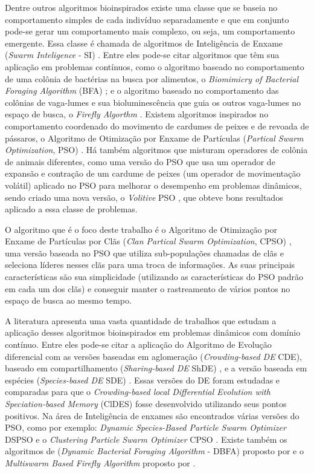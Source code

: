 Dentre outros algoritmos bioinspirados existe uma classe que se baseia no comportamento simples de cada indivíduo separadamente e que em conjunto pode-se gerar um comportamento mais complexo, ou seja, um comportamento emergente. Essa classe é chamada de algoritmos de Inteligência de Enxame (\textit{Swarm Inteligence} - SI) \cite{parpinelli2011new}. Entre eles pode-se citar algoritmos que têm sua aplicação em problemas contínuos, como o algoritmo baseado no comportamento de uma colônia de bactérias na busca por alimentos, o \textit{Biomimicry of Bacterial Foraging Algorithm} (BFA) \cite{passino2002biomimicry}; e o algoritmo baseado no comportamento das colônias de vaga-lumes e sua bioluminescência que guia os outros vaga-lumes no espaço de busca, o \textit{Firefly Algorthm} \cite{firefly}. Existem algoritmos inspirados no comportamento coordenado do movimento de cardumes de peixes e de revoada de pássaros, o Algoritmo de Otimização por Enxame de Partículas (\textit{Partical Swarm Optimization}, PSO) \cite{pso}. Há também algoritmos que misturam operadores de colônia de animais diferentes, como uma versão do PSO que usa um operador de expansão e contração de um cardume de peixes (um operador de movimentação volátil) aplicado no PSO para melhorar o desempenho em problemas dinâmicos, sendo criado uma nova versão, o \textit{Volitive} PSO \cite{cavalcanti2011hybrid}, que obteve bons resultados aplicado a essa classe de problemas.

O algoritmo que é o foco deste trabalho é o Algoritmo de Otimização por Enxame de Partículas por Clãs (\textit{Clan Partical Swarm Optimization}, CPSO) \cite{ferreira2009clan}, uma versão baseada no PSO que utiliza sub-populações chamadas de clãs e seleciona líderes nesses clãs para uma troca de informações. As suas principais características são sua simplicidade (utilizando as características do PSO padrão em cada um dos clãs) e conseguir manter o rastreamento de vários pontos no espaço de busca ao mesmo tempo.

A literatura apresenta uma vasta quantidade de trabalhos que estudam a aplicação desses algoritmos bioinspirados em problemas dinâmicos com domínio contínuo. Entre eles pode-se citar a aplicação do Algoritmo de Evolução diferencial com as versões baseadas em aglomeração (\textit{Crowding-based DE} CDE), baseado em compartilhamento (\textit{Sharing-based DE} ShDE) \cite{thomsen2004multimodal}, e a versão baseada em espécies (\textit{Species-based DE} SDE) \cite{li2005efficient}. Essas versões do DE foram estudadas e comparadas para que o \textit{Crowding-based local Differential Evolution with Speciation-based Memory} (ClDES) fosse desenvolvido utilizando seus pontos positivos. Na área de Inteligência de enxames são encontrados várias versões do PSO, como por exemplo: \textit{Dynamic Species-Based Particle Swarm Optimizer} DSPSO \cite{parrott2006locating} e o \textit{Clustering Particle Swarm Optimizer} CPSO \cite{yang2010clustering}. Existe também os algoritmos de (\textit{Dynamic Bacterial Foraging Algorithm} - DBFA) proposto por \cite{passino2002biomimicry} e o \textit{Multiswarm Based Firefly Algorithm} proposto por \cite{farahani2011multiswarm}.

